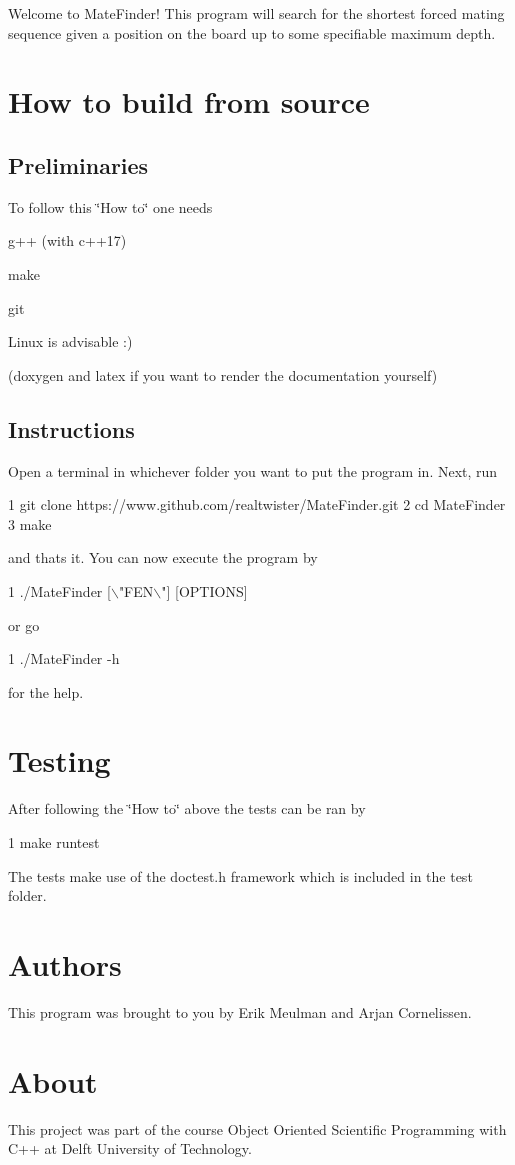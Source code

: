 Welcome to Mate\+Finder! This program will search for the shortest forced mating sequence given a position on the board up to some specifiable maximum depth.\hypertarget{index_HowTo}{}\section{How to build from source}\label{index_HowTo}
\hypertarget{index_Preliminaries}{}\subsection{Preliminaries}\label{index_Preliminaries}
To follow this \char`\"{}\+How to\char`\"{} one needs
\begin{DoxyItemize}
\item g++ (with c++17)
\item make
\item git
\item Linux is advisable \+:)
\item (doxygen and latex if you want to render the documentation yourself) 
\end{DoxyItemize}\hypertarget{index_Instructions}{}\subsection{Instructions}\label{index_Instructions}
Open a terminal in whichever folder you want to put the program in. Next, run 
\begin{DoxyCode}
1 git clone https://www.github.com/realtwister/MateFinder.git
2 cd MateFinder
3 make
\end{DoxyCode}
 and that\textquotesingle{}s it. You can now execute the program by 
\begin{DoxyCode}
1 ./MateFinder [\(\backslash\)"FEN\(\backslash\)"] [OPTIONS]
\end{DoxyCode}
 or go 
\begin{DoxyCode}
1 ./MateFinder -h
\end{DoxyCode}
 for the help.\hypertarget{index_Testing}{}\section{Testing}\label{index_Testing}
After following the \char`\"{}\+How to\char`\"{} above the tests can be ran by 
\begin{DoxyCode}
1 make runtest
\end{DoxyCode}
 The tests make use of the {\ttfamily doctest.\+h} framework which is included in the {\ttfamily test} folder. \hypertarget{index_Authors}{}\section{Authors}\label{index_Authors}
This program was brought to you by Erik Meulman and Arjan Cornelissen.\hypertarget{index_About}{}\section{About}\label{index_About}
This project was part of the course Object Oriented Scientific Programming with C++ at Delft University of Technology. 